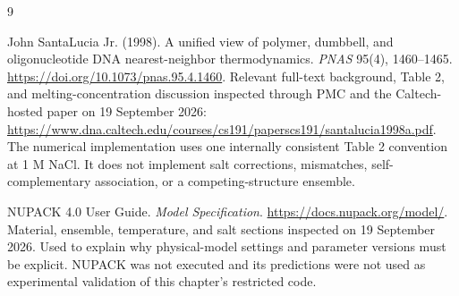 \renewcommand{\bibname}{Sources and reading notes}
\begin{thebibliography}{9}
John SantaLucia Jr. (1998). A unified view of polymer, dumbbell, and
oligonucleotide DNA nearest-neighbor thermodynamics.
\emph{PNAS} 95(4), 1460--1465.
\url{https://doi.org/10.1073/pnas.95.4.1460}.
Relevant full-text background, Table 2, and melting-concentration discussion
inspected through PMC and the Caltech-hosted paper on 19 September 2026:
\url{https://www.dna.caltech.edu/courses/cs191/paperscs191/santalucia1998a.pdf}.
The numerical implementation uses one internally consistent Table 2
convention at 1 M NaCl. It does not implement salt corrections, mismatches,
self-complementary association, or a competing-structure ensemble.

NUPACK 4.0 User Guide. \emph{Model Specification}.
\url{https://docs.nupack.org/model/}.
Material, ensemble, temperature, and salt sections inspected on
19 September 2026. Used to explain why physical-model settings and parameter
versions must be explicit. NUPACK was not executed and its predictions were
not used as experimental validation of this chapter's restricted code.
\end{thebibliography}
